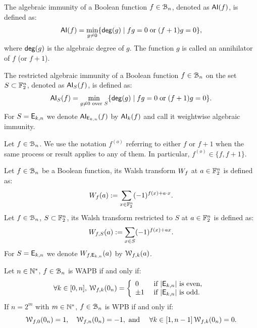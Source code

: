 \documentclass[11pt]{llncs}
\begin{document}
\begin{definition} \label{def:ai}
	The algebraic immunity of a Boolean function $f\in \mathcal{B}_{n}$, denoted as $\mathsf{AI}(f)$, is defined as:
	\[ \mathsf{AI}(f) = \min_{g \neq 0}\{ \mathsf{deg}(g) \; | \; fg = 0 \; \text{or} \; (f + 1)g = 0 \}{,} \]
	where $\mathsf{deg}(g)$ is the algebraic degree of $g$.
	The function $g$ is called an annihilator of $f$ (or $f + 1$). 
	
The restricted algebraic immunity of a Boolean function $f\in \mathcal{B}_{n}$ on the set $S\subset \mathbb{F}_2^n$, denoted as $\mathsf{AI}_S(f)$, is defined as:
\[ \mathsf{AI}_S(f) = \min_{g \neq 0 \text{ over } S}\{ \mathsf{deg}(g) \; | \; fg = 0 \; \text{or} \; (f + 1)g = 0 \}{.} \]	
For $S=\mathsf{E}_{k,n}$ we denote $\mathsf{AI}_{\mathsf{E}_{k,n}}(f)$ by $\mathsf{AI}_{k}(f)$ and call it weightwise algebraic immunity.
	
	
\end{definition}

\begin{remark}
    Let $f\in \mathcal{B}_{n}$. We use the notation $f^{(o)}$ referring to either $f$ or $f + 1$ when the same process or result applies to any of them. 
    In particular, $f^{(o)} \in \{f, f + 1\}$.
\end{remark}


\iffalse
\begin{definition}\label{def:walsh_transform}
	Let $f\in \mathcal{B}_{n}$ be a Boolean function, its Walsh transform $W_{f}$ at $a \in \mathbb{F}_2^n$ is defined as:
	\[  W_{f} (a) := \sum_{x \in \mathbb{F}_2^n} (-1)^{f(x) +  a \cdot x }.\]
	Let $f\in \mathcal{B}_{n}$, $S \subset \mathbb{F}_2^n$, its Walsh transform restricted to $S$ at $a \in \mathbb{F}_2^n$ is defined as:
	\[  W_{f,S} (a) := \sum_{x\in S} (-1)^{f(x)+ax}.\]
	For $S=\mathsf{E}_{k,n}$ we denote $W_{f,\mathsf{E}_{k,n}} (a)$ by $\mathcal{W}_{f,k}(a)$.%
	
\end{definition}

\begin{Prop}\label{prop:WAPBWalsh}
	
Let $n\in \mathbb{N}^*$, $f\in \mathcal{B}_{n}$ is WAPB if and only if:
\[\forall k \in [0,n], \, \mathcal{W}_{f,k}(0_n)=   
\left \{
\begin{array}{l l}
0  & \text{ if } |\mathsf{E}_{k,n}| \text{ is even, } \\
\pm 1 & \text{ if }  |\mathsf{E}_{k,n}| \text{ is odd.}
\end{array}\right. \] 
If $n=2^m$ with $m\in \mathbb{N}^*$, $f\in \mathcal{B}_{n}$ is WPB if and only if:
\[\mathcal{W}_{f,0}(0_n)=1, \quad \mathcal{W}_{f,n}(0_n)=-1, \text{ and } \quad \forall k \in [1,n-1] \,  \mathcal{W}_{f,k}(0_n)=0. \] 
	
\end{Prop}
\end{document}
